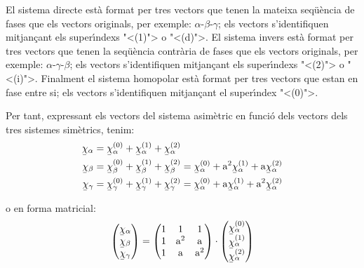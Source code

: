  
 El sistema directe est\`{a} format per tres
vectors que tenen la mateixa seq\"{u}\`{e}ncia de fases que els vectors
originals, per exemple: $\alpha$-$\beta$-$\gamma$; els vectors
s'identifiquen mitjan\c{c}ant els super\'{\i}ndexs {"<}(1){">} o {"<}(d){">}. El sistema
invers est\`{a} format per tres vectors que tenen la seq\"{u}\`{e}ncia contr\`{a}ria
de fases que els vectors originals, per exemple:
$\alpha$-$\gamma$-$\beta$; els vectors s'identifiquen mitjan\c{c}ant els
super\'{\i}ndexs {"<}(2){">} o {"<}(i){">}. Finalment el sistema homopolar est\`{a}
format per tres vectors que estan en fase entre si; els vectors
s'identifiquen mitjan\c{c}ant el super\'{\i}ndex {"<}(0){">}.

Per tant, expressant els vectors del sistema asim\`{e}tric en funci\'{o}
dels vectors dels tres sistemes sim\`{e}trics, tenim:
\begin{subequations}
\begin{align}
   \cmplx{\chi}_\alpha &= \cmplx{\chi}_\alpha\ap{(0)}  +
   \cmplx{\chi}_\alpha\ap{(1)} + \cmplx{\chi}_\alpha\ap{(2)} \label{eq:c_sim_a}\\
   \cmplx{\chi}_\beta &= \cmplx{\chi}_\beta\ap{(0)} + \cmplx{\chi}_\beta\ap{(1)} +
   \cmplx{\chi}_\beta\ap{(2)}  =  \cmplx{\chi}_\alpha\ap{(0)} + \au^2
   \cmplx{\chi}_\alpha\ap{(1)} + \au \cmplx{\chi}_\alpha\ap{(2)} \label{eq:c_sim_b}\\
   \cmplx{\chi}_\gamma &= \cmplx{\chi}_\gamma\ap{(0)} + \cmplx{\chi}_\gamma\ap{(1)} +
   \cmplx{\chi}_\gamma\ap{(2)}  = \cmplx{\chi}_\alpha\ap{(0)} + \au
   \cmplx{\chi}_\alpha\ap{(1)} + \au^2 \cmplx{\chi}_\alpha\ap{(2)} \label{eq:c_sim_c}
\end{align}
\end{subequations}

o en forma matricial:
\begin{equation}
   \begin{pmatrix}
     \cmplx{\chi}_\alpha \\
     \cmplx{\chi}_\beta \\
     \cmplx{\chi}_\gamma
   \end{pmatrix} =
   \begin{pmatrix}
     1 & 1 & 1 \\
     1 & \au^2 & \au\\
     1 & \au & \au^2
   \end{pmatrix} \cdot
   \begin{pmatrix}
     \cmplx{\chi}_\alpha\ap{(0)} \\
     \cmplx{\chi}_\alpha\ap{(1)} \\
     \cmplx{\chi}_\alpha\ap{(2)}
   \end{pmatrix}
\end{equation}

